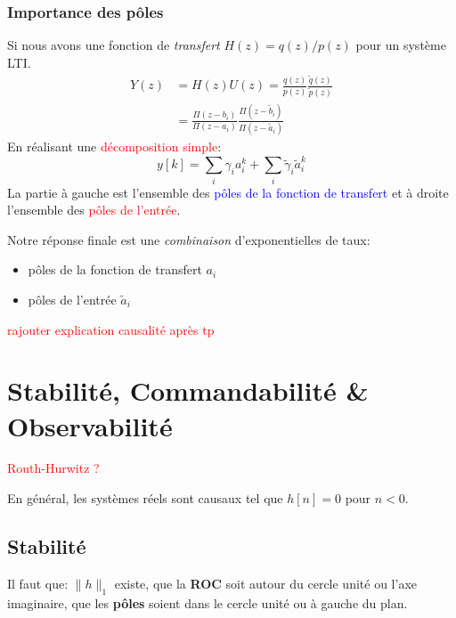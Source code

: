 \documentclass{report}
\begin{document}
\subsection{Importance des pôles}
Si nous avons une fonction de \textit{transfert} $H(z) = q(z)/p(z)$ pour un système LTI.
\begin{align*}
Y(z) &= H(z) U(z) = \frac{q(z)}{p(z)} \frac{\tilde{q}(z)}{\tilde{p}(z)}\\
&= \frac{\Pi (z-b_i)}{\Pi (z-a_i)} \frac{\Pi (z- \tilde{b}_i)}{\Pi (z - \tilde{a}_i)}
\end{align*}
En réalisant une \textcolor{red}{décomposition simple}:
\begin{equation}
y[k] = \sum_i \gamma_i a_i^k + \sum_i \tilde{\gamma}_i \tilde{a}_i^k
\end{equation}
La partie à gauche est l'ensemble des \textcolor{blue}{pôles de la fonction de transfert} et à droite l'ensemble des \textcolor{red}{pôles de l'entrée}.\par
Notre réponse finale est une \textit{combinaison} d'exponentielles de taux:
\begin{itemize}
\item pôles de la fonction de transfert $a_i$
\item pôles de l'entrée $\tilde{a}_i$
\end{itemize}

\textcolor{red}{rajouter explication causalité après tp}


\chapter{Stabilité, Commandabilité \& Observabilité}

\textcolor{red}{Routh-Hurwitz ?}

En général, les systèmes réels sont causaux tel que $h[n] = 0$ pour $n<0$.
\section{Stabilité}
Il faut que: $\parallel h \parallel_1$ existe, que la \textbf{ROC} soit autour du cercle unité ou l'axe imaginaire, que les \textbf{pôles} soient dans le cercle unité ou à gauche du plan.
\end{document}
